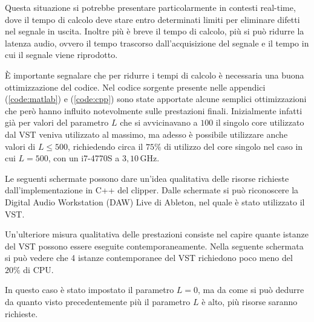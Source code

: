 		Questa situazione si potrebbe presentare particolarmente in contesti real-time, dove il tempo di calcolo deve stare entro determinati limiti per eliminare difetti nel segnale in uscita. Inoltre più è breve il tempo di calcolo, più si può ridurre la latenza audio, ovvero il tempo trascorso dall'acquisizione del segnale e il tempo in cui il segnale viene riprodotto.
		
		È importante segnalare che per ridurre i tempi di calcolo è necessaria una buona ottimizzazione del codice. Nel codice sorgente presente nelle appendici (\ref{code:matlab}) e (\ref{code:cpp}) sono state apportate alcune semplici ottimizzazioni che però hanno influito notevolmente sulle prestazioni finali. Inizialmente infatti già per valori del parametro $L$ che si avvicinavano a $100$ il singolo core utilizzato dal VST veniva utilizzato al massimo, ma adesso è possibile utilizzare anche valori di $L \le 500$, richiedendo circa il $75\%$ di utilizzo del core singolo nel caso in cui $L = 500$, con un i7-4770S a $3,10\,$GHz.
		
		Le seguenti schermate possono dare un'idea qualitativa delle risorse richieste dall'implementazione in C++ del clipper. Dalle schermate si può riconoscere la Digital Audio Workstation (DAW) Live di Ableton, nel quale è stato utilizzato il VST.
		
		\pagebreak
		\vspace*{-35px}
		\vspace*{-10px}
		\pagebreak
		
		Un'ulteriore misura qualitativa delle prestazioni consiste nel capire quante istanze del VST possono essere eseguite contemporaneamente. Nella seguente schermata si può vedere che 4 istanze contemporanee del VST richiedono poco meno del $20\%$ di CPU.
		
		
		In questo caso è stato impostato il parametro $L = 0$, ma da come si può dedurre da quanto visto precedentemente più il parametro $L$ è alto, più risorse saranno richieste.
		
		